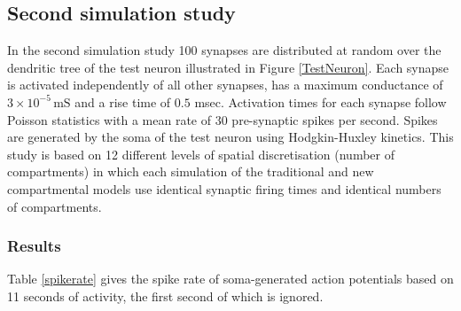 \subsection{Second simulation study}\label{sim2}

In the second simulation study 100 synapses are distributed at
random over the dendritic tree of the test neuron illustrated in
Figure \ref{TestNeuron}. Each synapse is activated independently
of all other synapses, has a maximum conductance of
$3\times10^{-5}\,\mbox{mS}$ and a rise time of $0.5$ msec.
Activation times for each synapse follow Poisson statistics with a
mean rate of 30 pre-synaptic spikes per second. Spikes are
generated by the soma of the test neuron using Hodgkin-Huxley
kinetics. This study is based on 12 different levels of spatial
discretisation (number of compartments) in which each simulation
of the traditional and new compartmental models use identical
synaptic firing times and identical numbers of compartments.

\subsubsection{Results}

Table \ref{spikerate} gives the spike rate of soma-generated
action potentials based on 11 seconds of activity, the first
second of which is ignored.

